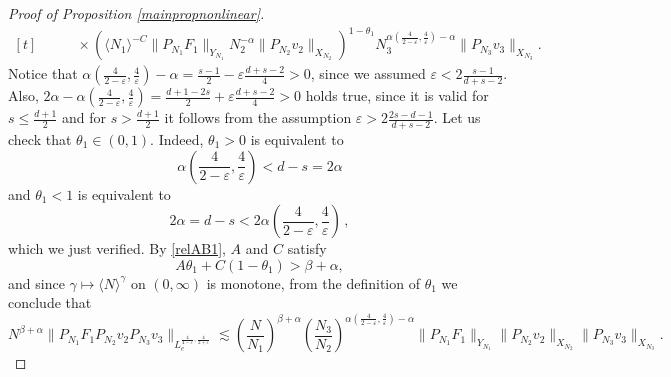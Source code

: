 \documentclass[aihp]{imsart}
\numberwithin{equation}{section}
\theoremstyle{plain}
\theoremstyle{remark}
\begin{document}
\begin{proof}[Proof of Proposition \ref{mainpropnonlinear}]
\begin{equation*}
\begin{aligned}[t]
&\qquad \times  (\langle N_1 \rangle^{-C}\|P_{N_1} F_1\|_{Y_{N_1}} N_2^{-\alpha} \|P_{N_2} v_2 \|_{X_{N_2}} )^{1-\theta_1}  N_3^{\alpha (\frac{4}{2-\varepsilon} ,\frac{4}{\varepsilon}) -\alpha}\|P_{N_3} v_3\|_{X_{N_3}}.
\end{aligned}
\end{equation*}
Notice that $\alpha (\frac{4}{2-\varepsilon} ,\frac{4}{\varepsilon}) - \alpha= \frac{s-1}{2}-\varepsilon \frac{d+s-2}{4}>0 $, since we assumed 
$\varepsilon < 2\frac{s-1}{d+s-2}$. 
Also, $2\alpha - \alpha (\frac{4}{2-\varepsilon} ,\frac{4}{\varepsilon})= \frac{d+1-2s}{2}+ \varepsilon \frac{d+s-2}{4}>0$ holds true, since it is valid for $s\leq \frac{d+1}{2}$ 
and for $s> \frac{d+1}{2}$ it follows from the assumption $\varepsilon > 2\frac{2s-d-1}{d+s-2}$. 
Let us check that $\theta_1 \in (0, 1)$. Indeed, $\theta_1 > 0$ is equivalent to 
$$
\alpha \left(\frac{4}{2-\varepsilon} ,\frac{4}{\varepsilon}\right) < d - s = 2 \alpha
$$
and $\theta_1 < 1$ is equivalent to 
$$
2\alpha = d - s < 2 \alpha \left(\frac{4}{2-\varepsilon} ,\frac{4}{\varepsilon}\right) \,,
$$
which we just verified. 
By \eqref{relAB1}, $A$ and $C$ satisfy
$$A\theta_1 +C (1-\theta_1)>\beta +\alpha,$$
and since $\gamma \mapsto \langle N \rangle^\gamma$ on $(0, \infty)$ is monotone, from the definition of $\theta_1$ we conclude that
\begin{equation*}
N^{\beta +\alpha}  \|P_{N_1}F_1 P_{N_2} v_2 P_{N_3} v_3\|_{L^{\frac{4}{4-\varepsilon} ,\frac{4}{2+\varepsilon}}_e} 
\lesssim \left(\frac{N}{N_1}\right)^{\beta +\alpha} \left(\frac{N_3} {N_2}\right)^{\alpha (\frac{4}{2-\varepsilon} ,\frac{4}{\varepsilon}) -\alpha}   \|P_{N_1}F_1\|_{Y_{N_1}}  \|P_{N_2}v_2\|_{X_{N_2}}   
\|P_{N_3}v_3\|_{X_{N_3}} .
\end{equation*}


\end{proof}
\end{document}
